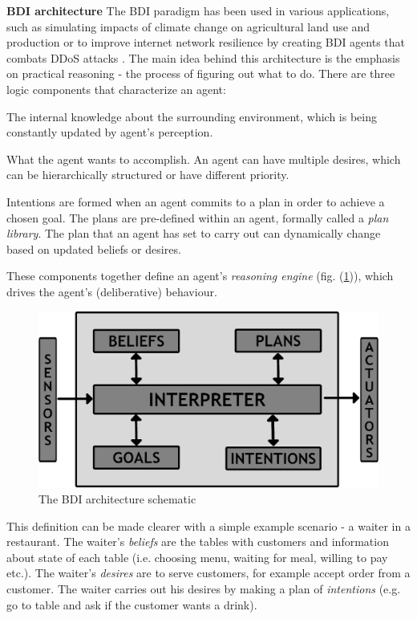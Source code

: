 \documentclass[main.tex]{subfiles}
\begin{document}
\textbf{BDI architecture}\newline
The BDI paradigm has been used in various applications, such as simulating impacts of climate
change on agricultural land use and production \cite{Caillou2017} or to improve internet
network resilience by creating BDI agents that combats DDoS attacks \cite{Nunes2017}. The main
idea behind this architecture is the emphasis on practical reasoning - the process of figuring
out what to do. There are three logic components that characterize an agent:

The internal knowledge about the surrounding environment, which
is being constantly updated by agent's perception.

What the agent wants to accomplish. An agent can have multiple desires, which can be
hierarchically structured or have different priority.

Intentions are formed when an agent commits to a plan in order to achieve a chosen goal.
The plans are pre-defined within an agent, formally called a \emph{plan library}.
The plan that an agent has set to carry out can dynamically change based on updated beliefs or
desires.

These components together define an agent's \emph{reasoning engine} (fig. (\ref{bdi-schematic})),
which drives the agent's (deliberative) behaviour. 

\begin{figure}[htbp]
    \centering
    \includegraphics[width = .8\textwidth]{bdi-infographic.png}
    \caption{The BDI architecture schematic}
    \label{bdi-schematic}
\end{figure}

This definition can be made clearer with a simple example scenario - a waiter in a restaurant.
The waiter's \emph{beliefs} are the tables with customers and information about state of each
table (i.e.  choosing menu, waiting for meal, willing to pay etc.). The waiter's \emph{desires}
are to serve customers, for example accept order from a customer. The waiter carries out his
desires by making a plan of \emph{intentions} (e.g. go to table and ask if the customer wants a
drink).
\end{document}
